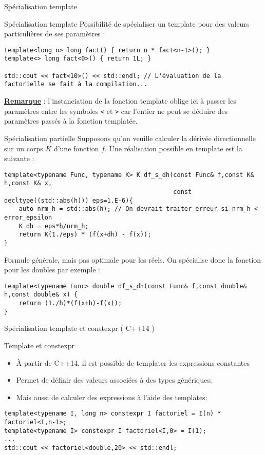 \documentclass[handout,10pt]{beamer}
\begin{document}
\begin{frame}[fragile]{Spécialisation template}
\tiny
\begin{block}{Spécialisation template}
Possibilité de spécialiser un template pour des valeurs particulières de ses paramètres :
\begin{lstlisting}
template<long n> long fact() { return n * fact<n-1>(); }
template<> long fact<0>() { return 1L; }

std::cout << fact<10>() << std::endl; // L'évaluation de la factorielle se fait à la compilation...
\end{lstlisting}
\textbf{\underline{Remarque}} : l'instanciation de la fonction template oblige ici à passer les paramètres entre les symboles
\lstinline$<$ et \lstinline$>$ car l'entier ne peut se déduire des paramètres passés à la fonction templatée.
\end{block}

\begin{block}{Spécialisation partielle}
Supposons qu'on veuille calculer la dérivée directionnelle sur un corps $K$ d'une fonction $f$.
Une réalisation possible en template est la suivante :
\begin{lstlisting}
template<typename Func, typename K> K df_s_dh(const Func& f,const K& h,const K& x,
                                              const decltype((std::abs(h))) eps=1.E-6){
    auto nrm_h = std::abs(h); // On devrait traiter erreur si nrm_h < error_epsilon
    K dh = eps*h/nrm_h;
    return K(1./eps) * (f(x+dh) - f(x));
}\end{lstlisting}
Formule générale, mais pas optimale pour les réels. On spécialise donc la fonction pour les doubles par exemple :
\begin{lstlisting}
template<typename Func> double df_s_dh(const Func& f,const double& h,const double& x) {    
    return (1./h)*(f(x+h)-f(x));
}\end{lstlisting}
\end{block}
\end{frame}

\begin{frame}[fragile]{Spécialisation template et constexpr ( C++14 )}
\tiny
\begin{block}{Template et constexpr}
\begin{itemize}
\item À partir de C++14, il est possible de templater les expressions constantes
\item Permet de définir des valeurs associées à des types génériques;
\item Mais aussi de calculer des expressions à l'aide des templates;
\end{itemize}
\begin{lstlisting}
template<typename I, long n> constexpr I factoriel = I(n) * factoriel<I,n-1>;
template<typename I> constexpr I factoriel<I,0> = I(1);
...
std::cout << factoriel<double,20> << std::endl;
\end{lstlisting}
\end{block}
\end{frame}
\end{document}
